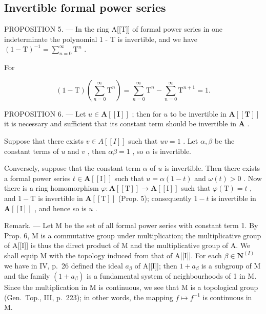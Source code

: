 \subsection{Invertible formal power series}

PROPOSITION 5. --- In the ring A{[}{[}T{]}{]} of formal power series in one indeterminate the polynomial 1 - T is invertible, and we have \((1 - \mathrm{T})^{-1} = \sum_{n=0}^{\infty} \mathrm{T}^{n}\) .

For

\[
(1 - \mathrm{T}) \left(\sum_ {n = 0} ^ {\infty} \mathrm{T} ^ {n}\right) = \sum_ {n = 0} ^ {\infty} \mathrm{T} ^ {n} - \sum_ {n = 0} ^ {\infty} \mathrm{T} ^ {n + 1} = 1.
\]

PROPOSITION 6. --- Let \(u \in \mathbf{A}[[\mathbf{I}]]\) ; then for \(u\) to be invertible in \(\mathbf{A}[[\mathbf{T}]]\) it is necessary and sufficient that its constant term should be invertible in \(\mathbf{A}\) .

Suppose that there exists \(v \in A[[I]]\) such that \(uv = 1\) . Let \(\alpha, \beta\) be the constant terms of \(u\) and \(v\) , then \(\alpha\beta = 1\) , so \(\alpha\) is invertible.

Conversely, suppose that the constant term \(\alpha\) of \(u\) is invertible. Then there exists a formal power series \(t \in \mathbf{A}[[\mathrm{I}]]\) such that \(u = \alpha(1 - t)\) and \(\omega(t) > 0\) . Now there is a ring homomorphism \(\varphi: \mathbf{A}[[\mathrm{T}]] \to \mathbf{A}[[\mathrm{I}]]\) such that \(\varphi(\mathrm{T}) = t\) , and \(1 - \mathrm{T}\) is invertible in \(\mathbf{A}[[\mathrm{T}]]\) (Prop. 5); consequently \(1 - t\) is invertible in \(\mathbf{A}[[\mathrm{I}]]\) , and hence so is \(u\) .

Remark. --- Let M be the set of all formal power series with constant term 1. By Prop. 6, M is a commutative group under multiplication; the multiplicative group of A{[}{[}I{]}{]} is thus the direct product of M and the multiplicative group of A. We shall equip M with the topology induced from that of A{[}{[}I{]}{]}. For each \(\beta \in \mathbf{N}^{(I)}\) we have in IV, p.~26 defined the ideal \(a_{\beta}\) of A{[}{[}I{]}{]}; then \(1 + a_{\beta}\) is a subgroup of M and the family \((1 + a_{\beta})\) is a fundamental system of neighbourhoods of 1 in M. Since the multiplication in M is continuous, we see that M is a topological group (Gen.~Top., III, p.~223); in other words, the mapping \(f \mapsto f^{-1}\) is continuous in M.

